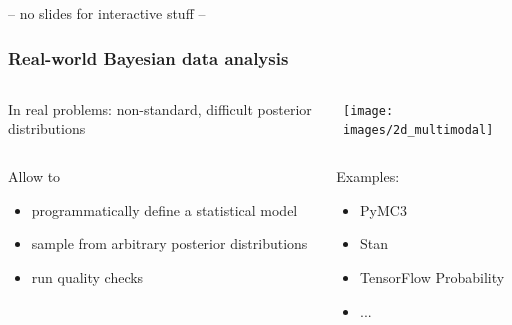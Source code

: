 \documentclass[t,aspectratio=169]{beamer}
\begin{document}
\begin{frame}
  \centering
  \vfill
  \Huge-- no slides for interactive stuff --
  \vfill
\end{frame}




\def\tikzoverlay{%
   \tikz[baseline,overlay]\node[every overlay node]
}%


\begin{frame}
  \frametitle{Real-world Bayesian data analysis}
  \begin{columns}
    \begin{column}[T]{0.48\textwidth}
      In real problems: non-standard, difficult posterior distributions\\
    \end{column}
    \begin{column}[T]{0.48\textwidth}
      \texttt{[image: images/2d\_multimodal]}
    \end{column}
  \end{columns}
  \begin{columns}
    \begin{column}{0.6\textwidth}
      \begin{tcolorbox}[title=Probabilistic programming libraries]
        Allow to
        \begin{itemize}
        \item programmatically define a statistical model
        \item sample from arbitrary posterior distributions
        \item run quality checks
        \end{itemize}
      \end{tcolorbox}
    \end{column}
    \begin{column}{0.38\textwidth}
      \vfill
      Examples:
      \begin{itemize}
      \item PyMC3
      \item Stan
      \item TensorFlow Probability
      \item ...
      \end{itemize}
      \vfill
    \end{column}
  \end{columns}
\end{frame}
\end{document}
